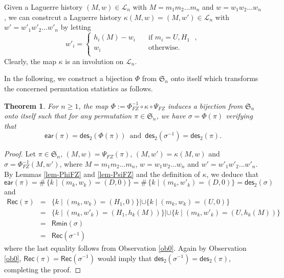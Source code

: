 \documentclass[12pt]{article}
\numberwithin{equation}{section}
\theoremstyle{plain}
\newtheorem{theorem}{Theorem}[section]
\def\Rec{\mathsf{Rec}}
\def\des{\mathsf{des}}
\def\ear{\mathsf{ear}}
\def\Rmin{\mathsf{Rmin}}
\begin{document}
     
     
      
      
     
     Given a  Laguerre history  $(M,w)\in \mathcal{L}_n$ with $M=m_1m_2\ldots m_n$ and $w=w_1w_2\ldots w_n$, we can constrcut a Laguerre history  $\kappa(M,w)=(M,w')\in \mathcal{L}_n$  with $w'=w'_1w'_2\ldots w'_n$ by letting
     $$
    w'_i=	\begin{cases}
      h_i(M)-w_i&\quad \text{if $m_i=U, H_1$ },\\
     w_i&\quad \text{otherwise}.\\ 
     \end{cases}
     $$
    Clearly, the map $\kappa$ is an involution on $\mathcal{L}_n$.   
    
    
    
    In the following, 
   we construct a bijection $\Phi$ from  $\mathfrak{S}_n$ onto  itself  which transforms the concerned permutation statistics as follows. 
    \begin{theorem}\label{thm-Phi}
    	For $n\geq 1$, the map $\Phi:=\Phi^{-1}_{FZ}\circ \kappa \circ \Psi_{FZ}$  induces a bijection  from  $\mathfrak{S}_n$ onto itself such that for any permutation $\pi\in \mathfrak{S}_n$, we have $\sigma=\Phi(\pi)$ verifying that
    	$$
    	\ear(\pi)=\des_2(\Phi(\pi))\,\,\,  \mbox{and}\,\,\,  \des_2(\sigma^{-1})=\des_2(\pi).
    	$$
    	 
    	\end{theorem}
    	\begin{proof}	 
    Let $\pi\in \mathfrak{S}_n$, $(M,w)=\Psi_{FZ}(\pi)$, $(M,w')=\kappa(M,w)$ and $\sigma=\Phi^{-1}_{FZ}(M, w')$, where $M=m_1m_2\ldots m_n$, $w=w_1w_2\ldots w_n$ and $w'=w'_1w'_2\ldots w'_n$. 
By Lemmas \ref{lem-PhiFZ} and \ref{lem-PsiFZ} and the definition of $\kappa$, we deduce that 
   $$
   \ear(\pi)=\#\,\{k\mid (m_k, w_k)=(D, 0)\}=\#\,\{k\mid (m_k, w'_k)=(D, 0)\}=\des_2(\sigma)
   $$
   and 
   $$
   \begin{array}{lll}
   	 \Rec(\pi)&=&  \{k\mid (m_k, w_k)=(H_1, 0)\}| \cup\{k\mid (m_k, w_k)=(U, 0)\} \\
   	 &=&  \{k\mid (m_k, w'_k)=(H_1, h_k(M))\}| \cup\{k\mid (m_k, w'_k)=(U, h_k(M))\}\\
   	 &=& \Rmin(\sigma)\\
   	 &=& \Rec(\sigma^{-1})
   	\end{array}
   $$
   where the last equality follows from Observation \ref{ob0}.  Again by Observation \ref{ob0},  $\Rec(\pi)=\Rec(\sigma^{-1})$ would imply that 
  $\des_2(\sigma^{-1})=\des_2(\pi)$, completing the proof. 
  \end{proof}
\end{document}
